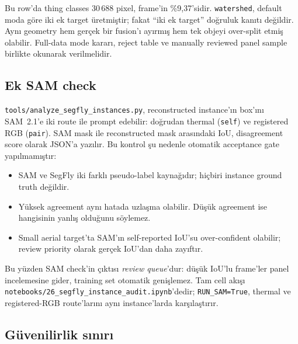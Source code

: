 Bu row'da thing classes 30\,688 pixel, frame'in \%9,37'sidir.
\texttt{watershed}, default moda göre iki ek target üretmiştir; fakat
“iki ek target” doğruluk kanıtı değildir. Aynı geometry hem gerçek bir
fusion'ı ayırmış hem tek objeyi over-split etmiş olabilir. Full-data mode
kararı, reject table ve manually reviewed panel sample birlikte okunarak
verilmelidir.

\subsection{Ek SAM check}

\texttt{tools/analyze\_segfly\_instances.py}, reconstructed instance'ın
box'ını SAM~2.1'e iki route ile prompt edebilir: doğrudan thermal
(\texttt{self}) ve registered RGB (\texttt{pair}). SAM mask ile
reconstructed mask arasındaki IoU, disagreement score olarak JSON'a yazılır.
Bu kontrol şu nedenle otomatik acceptance gate yapılmamıştır:

\begin{itemize}
  \item SAM ve SegFly iki farklı pseudo-label kaynağıdır; hiçbiri instance
        ground truth değildir.
  \item Yüksek agreement aynı hatada uzlaşma olabilir. Düşük agreement ise
        hangisinin yanlış olduğunu söylemez.
  \item Small aerial target'ta SAM'ın self-reported IoU'su over-confident
        olabilir; review priority olarak gerçek IoU'dan daha zayıftır.
\end{itemize}

Bu yüzden SAM check'in çıktısı \emph{review queue}'dur: düşük IoU'lu
frame'ler panel incelemesine gider, training set otomatik genişlemez. Tam
cell akışı \texttt{notebooks/26\_segfly\_instance\_audit.ipynb}'dedir;
\texttt{RUN\_SAM=True}, thermal ve registered-RGB route'larını aynı
instance'larda karşılaştırır.

\subsection{Güvenilirlik sınırı}

